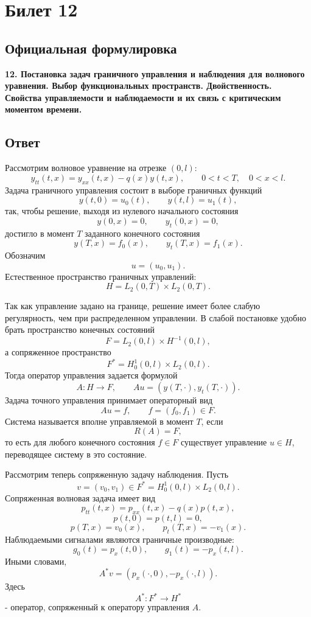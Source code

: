 \documentclass[12pt,a4paper]{article}
\begin{document}
\section*{Билет 12}

\subsection*{Официальная формулировка}
\textbf{12. Постановка задач граничного управления и наблюдения для волнового уравнения. Выбор функциональных пространств. Двойственность. Свойства управляемости и наблюдаемости и их связь с критическим моментом времени.}

\subsection*{Ответ}
Рассмотрим волновое уравнение на отрезке $(0,l)$:
\[
 y_{tt}(t,x)=y_{xx}(t,x)-q(x)y(t,x),
 \qquad 0<t<T,\quad 0<x<l.
\]
Задача граничного управления состоит в выборе граничных функций
\[
 y(t,0)=u_0(t),\qquad y(t,l)=u_1(t),
\]
так, чтобы решение, выходя из нулевого начального состояния
\[
 y(0,x)=0,\qquad y_t(0,x)=0,
\]
достигло в момент $T$ заданного конечного состояния
\[
 y(T,x)=f_0(x),\qquad y_t(T,x)=f_1(x).
\]
Обозначим
\[
 u=(u_0,u_1).
\]
Естественное пространство граничных управлений:
\[
 H=L_2(0,T)\times L_2(0,T).
\]

Так как управление задано на границе, решение имеет более слабую регулярность, чем при распределенном управлении. В слабой постановке удобно брать пространство конечных состояний
\[
 F=L_2(0,l)\times H^{-1}(0,l),
\]
а сопряженное пространство
\[
 F^*=H_0^1(0,l)\times L_2(0,l).
\]
Тогда оператор управления задается формулой
\[
 A:H\to F,\qquad Au=(y(T,\cdot),y_t(T,\cdot)).
\]
Задача точного управления принимает операторный вид
\[
 Au=f,\qquad f=(f_0,f_1)\in F.
\]
Система называется вполне управляемой в момент $T$, если
\[
 R(A)=F,
\]
то есть для любого конечного состояния $f\in F$ существует управление $u\in H$, переводящее систему в это состояние.

Рассмотрим теперь сопряженную задачу наблюдения. Пусть
\[
 v=(v_0,v_1)\in F^*=H_0^1(0,l)\times L_2(0,l).
\]
Сопряженная волновая задача имеет вид
\[
 p_{tt}(t,x)=p_{xx}(t,x)-q(x)p(t,x),
\]
\[
 p(t,0)=p(t,l)=0,
\]
\[
 p(T,x)=v_0(x),\qquad p_t(T,x)=-v_1(x).
\]
Наблюдаемыми сигналами являются граничные производные:
\[
 g_0(t)=p_x(t,0),\qquad g_1(t)=-p_x(t,l).
\]
Иными словами,
\[
 A^*v=(p_x(\cdot,0),-p_x(\cdot,l)).
\]
Здесь
\[
 A^*:F^*\to H^*
\]
- оператор, сопряженный к оператору управления $A$.
\end{document}
